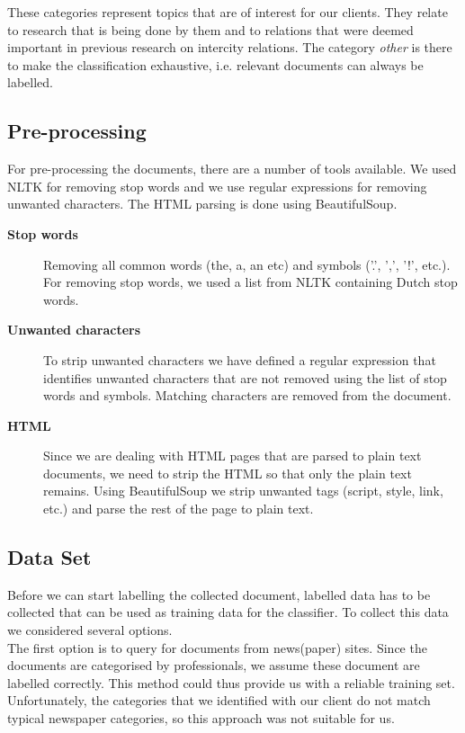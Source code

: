 These categories represent topics that are of interest for our clients. They relate to research that is being done by them and to relations that were deemed important in previous research on intercity relations. The category \textit{other} is there to make the classification exhaustive, i.e. relevant documents can always be labelled.

\subsection{Pre-processing}
For pre-processing the documents, there are a number of tools available. We used NLTK \cite{nlkt_stemming} for removing stop words and we use regular expressions for removing unwanted characters. The HTML parsing is done using BeautifulSoup\cite{BeautifulSoup}.

\begin{description}
\item[\textbf{Stop words}]
Removing all common words (the, a, an etc) and symbols ('.', ',', '!', etc.). For removing stop words, we used a list from NLTK containing Dutch stop words.
\item[\textbf{Unwanted characters}]
To strip unwanted characters we have defined a regular expression that identifies unwanted characters that are not removed using the list of stop words and symbols. Matching characters are removed from the document. 
\item[\textbf{HTML}]
Since we are dealing with HTML pages that are parsed to plain text documents, we need to strip the HTML so that only the plain text remains. Using BeautifulSoup we strip unwanted tags (script, style, link, etc.) and parse the rest of the page to plain text.
\end{description}

\subsection{Data Set}\label{sec: data-set-research}
Before we can start labelling the collected document, labelled data has to be collected that can be used as training data for the classifier. To collect this data we considered several options.\\

The first option is to query for documents from news(paper) sites. Since the documents are categorised by professionals, we assume these document are labelled correctly. This method could thus provide us with a reliable training set.
Unfortunately, the categories that we identified with our client do not match typical newspaper categories, so this approach was not suitable for us.\\

